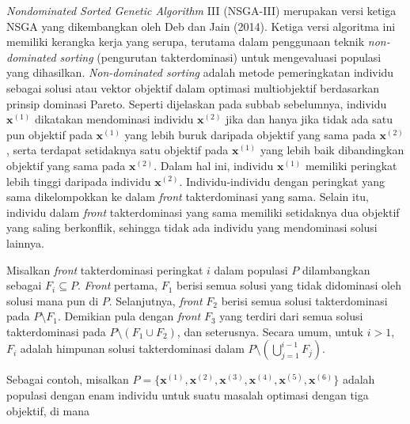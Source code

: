 \textit{Nondominated Sorted Genetic Algorithm} III (NSGA-III) merupakan versi ketiga NSGA yang dikembangkan oleh Deb dan Jain (2014). Ketiga versi algoritma ini memiliki kerangka kerja yang serupa, terutama dalam penggunaan teknik \textit{non-dominated sorting} (pengurutan takterdominasi) untuk mengevaluasi populasi yang dihasilkan. \textit{Non-dominated sorting} adalah metode pemeringkatan individu sebagai solusi atau vektor objektif dalam optimasi multiobjektif berdasarkan prinsip dominasi Pareto. Seperti dijelaskan pada subbab sebelumnya, individu $\mathbf{x}^{(1)}$ dikatakan mendominasi individu $\mathbf{x}^{(2)}$ jika dan hanya jika tidak ada satu pun objektif pada $\mathbf{x}^{(1)}$ yang lebih buruk daripada objektif yang sama pada $\mathbf{x}^{(2)}$, serta terdapat setidaknya satu objektif pada $\mathbf{x}^{(1)}$ yang lebih baik dibandingkan objektif yang sama pada $\mathbf{x}^{(2)}$. Dalam hal ini, individu $\mathbf{x}^{(1)}$ memiliki peringkat lebih tinggi daripada individu $\mathbf{x}^{(2)}$. Individu-individu dengan peringkat yang sama dikelompokkan ke dalam \textit{front} takterdominasi yang sama. Selain itu, individu dalam \textit{front} takterdominasi yang sama memiliki setidaknya dua objektif yang saling berkonflik, sehingga tidak ada individu yang mendominasi solusi lainnya.

Misalkan \textit{front} takterdominasi peringkat $i$ dalam populasi $P$ dilambangkan sebagai $F_i \subseteq P$. \textit{Front} pertama, $F_1$ berisi semua solusi yang tidak didominasi oleh solusi mana pun di $P$. Selanjutnya, \textit{front} $F_2$ berisi semua solusi takterdominasi pada $P \setminus F_1$. Demikian pula dengan \textit{front} $F_3$ yang terdiri dari semua solusi takterdominasi pada $P \setminus (F_1 \cup F_2)$, dan seterusnya. Secara umum, untuk $i > 1$, $F_i$ adalah himpunan solusi takterdominasi dalam $P\setminus(\bigcup_{j=1}^{i-1} F_j)$.  

Sebagai contoh, misalkan $P = \{\mathbf{x}^{(1)},\mathbf{x}^{(2)},\mathbf{x}^{(3)},\mathbf{x}^{(4)},\mathbf{x}^{(5)},\mathbf{x}^{(6)}\}$ adalah populasi dengan enam individu untuk suatu masalah optimasi dengan tiga objektif, di mana 

